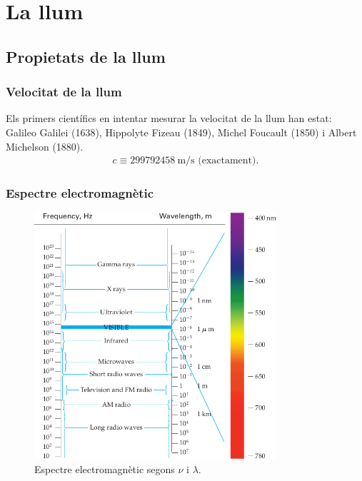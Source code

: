 \section{La llum}
\subsection{Propietats de la llum}
\subsubsection*{Velocitat de la llum}
Els primers científics en intentar mesurar la velocitat de la llum han estat: Galileo Galilei (1638), Hippolyte Fizeau (1849), Michel Foucault (1850) i Albert Michelson (1880).
\begin{align}
    \boxed{c \equiv \SI{299792458}{\m\per\s}} \text{ (exactament)}.
\end{align}

\subsubsection*{Espectre electromagnètic}
\begin{figure}[H]
\centering
    \includegraphics[width=0.8\textwidth]{images/3/31-espectre.png}
\caption{Espectre electromagnètic segons $\nu$ i $\lambda$.}
\end{figure}

